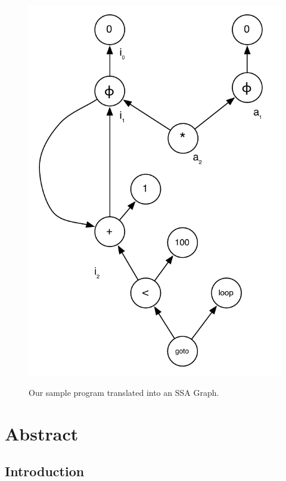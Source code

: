 \begin{figure}
\centering
\includegraphics[scale=0.5]{ssa-graph.pdf}
\label{fig: ssa-graph-example-graph}
\caption{Our sample program translated into an SSA Graph.}
\end{figure}


\section*{Abstract}

\subsection*{Introduction}

